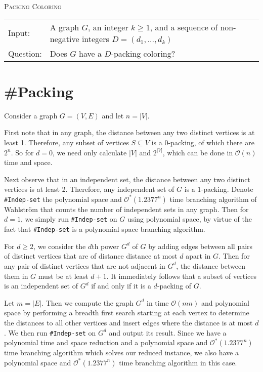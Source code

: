 \documentclass[10pt, a4paper]{article}
\theoremstyle{definition}
\newcommand{\mcO}{\mathcal{O}}
\newcommand{\n}{\\}
\begin{document}
\begin{algorithm}[H]
\textsc{Packing Coloring\n}
\begin{tabular}{l l}
 Input:    & A graph $G$, an integer $k \geq 1$, and a sequence of non-negative integers $D = (d_1,...,d_k)$ \n
 Question: & Does $G$ have a $D$-packing coloring? \n
\end{tabular}	
\end{algorithm}

\clearpage

\section{\#\sc Packing}


Consider a graph $G = (V, E)$ and let $n = |V|$.

First note that in any graph, the distance between any two distinct vertices is at least 1. Therefore, any subset of vertices $S \subseteq V$ is a $0$-packing, of which there are $2^n$. So for $d=0$, we need only calculate $|V|$ and $2^{|V|}$, which can be done in $\mcO(n)$ time and space.

Next observe that in an independent set, the distance between any two distinct vertices is at least 2. Therefore, any independent set of $G$ is a $1$-packing. Denote \texttt{\#Indep-set} the polynomial space and $\mcO^*(1.2377^n)$ time branching algorithm of Wahlstr\"{o}m \cite{Dahllof2005,Wahlstr2008} that counts the number of independent sets in any graph. Then for $d=1$, we simply run \texttt{\#Indep-set} on $G$ using polynomial space, by virtue of the fact that \texttt{\#Indep-set} is a polynomial space branching algorithm.

For $d \geq 2$, we consider the $d$th power $G^d$ of $G$ by adding edges between all pairs of distinct vertices that are of distance distance at most $d$ apart in $G$. Then for any pair of distinct vertices that are not adjacent in $G^d$, the distance between them in $G$ must be at least $d+1$. It immediately follows that a subset of vertices is an independent set of $G^d$ if and only if it is a $d$-packing of $G$.

Let $m=|E|$. Then we compute the graph $G^d$ in time $\mcO(mn)$ and polynomial space by performing a breadth first search starting at each vertex to determine the distances to all other vertices and insert edges where the distance is at most $d$. We then run \texttt{\#Indep-set} on $G^d$ and output its result. Since we have a polynomial time and space reduction and a polynomial space and $\mcO^*(1.2377^n)$ time branching algorithm which solves our reduced instance, we also have a polynomial space and $\mcO^*(1.2377^n)$ time branching algorithm in this case.
\end{document}
